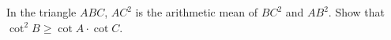 In the triangle $ABC$,  $AC^2$ is the arithmetic mean of $BC^2$ and $AB^2$. Show that $\cot^2B\ge \cot A\cdot\cot C$.